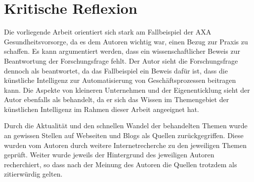 
\cleardoublepage
\section{Kritische Reflexion}
\label{chap:reflexion}

Die vorliegende Arbeit orientiert sich stark am Fallbeispiel der AXA Gesundheitsvorsorge, da es dem Autoren wichtig war, einen Bezug zur Praxis zu schaffen. Es kann argumentiert werden, dass ein wissenschaftlicher Beweis zur Beantwortung der Forschungsfrage fehlt. Der Autor sieht die Forschungsfrage dennoch als beantwortet, da das Fallbeispiel ein Beweis dafür ist, dass die künstliche Intelligenz zur Automatisierung von Geschäftsprozessen beitragen kann. Die Aspekte von kleineren Unternehmen und der Eigenenticklung sieht der Autor ebenfalls als behandelt, da er sich das Wissen im Themengebiet der künstlichen Intelligenz im Rahmen dieser Arbeit angeeignet hat.

Durch die Aktualität und den schnellen Wandel der behandelten Themen wurde an gewissen Stellen auf Webseiten und Blogs als Quellen zurückgegriffen. Diese wurden vom Autoren durch weitere Internetrecherche zu den jeweiligen Themen geprüft. Weiter wurde jeweils der Hintergrund des jeweiligen Autoren recherchiert, so dass nach der Meinung des Autoren die Quellen trotzdem als zitierwürdig gelten.